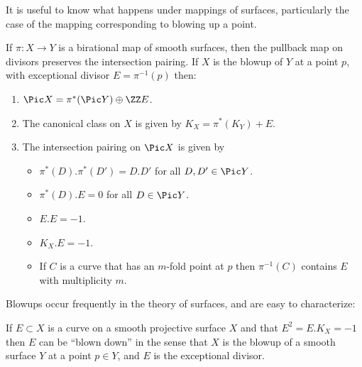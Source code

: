 It is useful to know what happens under mappings of surfaces, particularly the case of the mapping
corresponding to blowing up a point.

\begin{theorem}
If $\pi: X \to Y$ is a birational map of smooth surfaces, then the pullback map on divisors
preserves the intersection pairing. If $X$ is the blowup of $Y$ at a point $p$, with exceptional
divisor $E = \pi^{-1}(p)$ then:

\begin{enumerate}
 \item $\Pic X =\pi^*(\Pic Y) \oplus \ZZ E$.
\item The canonical class on $X$ is given by $K_X = \pi^*(K_Y)+E$.
 \item The intersection pairing on $\Pic X$ is given by
 
\begin{itemize}
\item $\pi^*(D).\pi^*(D') = D.D'$ for all $D,D'\in \Pic Y$.
\item $\pi^*(D).E = 0$ for all $D\in \Pic Y$.
 \item $E.E = -1$.
 \item $K_X.E = -1$.
 \item If $C$ is a curve that has an $m$-fold point at $p$ then $\pi^{-1}(C)$ contains $E$ with multiplicity $m$.
 \end{itemize}
\end{enumerate}
\end{theorem}

Blowups occur frequently in the theory of surfaces, and are easy to characterize:
\begin{theorem}
If $E\subset X$ is a curve on a smooth projective surface $X$ and
 that $E^2 = E.K_X = -1$ then $E$ can be ``blown down'' in the sense that
 $X$ is the blowup of a smooth surface $Y$ at a point $p\in Y$, and $E$ is the exceptional divisor.
\end{theorem}

